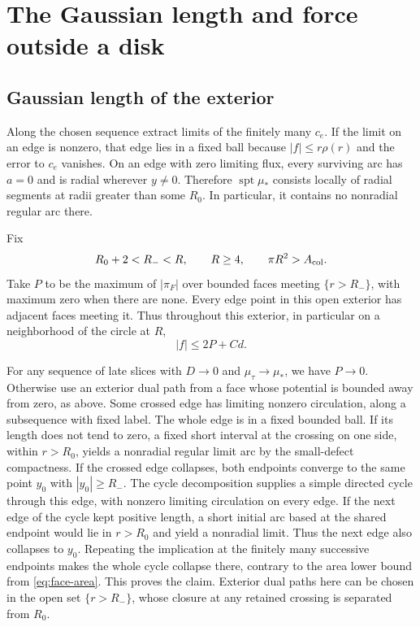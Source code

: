 \section{The Gaussian length and force outside a disk}\label{sec:exterior}

\subsection{Gaussian length of the exterior}

Along the chosen sequence extract limits of the finitely many \(c_e\). If the limit on an edge is nonzero, that edge lies in a fixed ball because \(|f|\le r\rho(r)\) and the error to \(c_e\) vanishes. On an edge with zero limiting flux, every surviving arc has \(a=0\) and is radial wherever \(y\ne0\). Therefore \(\operatorname{spt}\mu_*\) consists locally of radial segments at radii greater than some \(R_0\). In particular, it contains no nonradial regular arc there.

Fix \[
 R_0+2<R_-<R,\qquad R\ge4,\qquad \pi R^2>A_{\rm col}.
\] Take \(P\) to be the maximum of \(|\pi_F|\) over bounded faces meeting \(\{r>R_-\}\), with maximum zero when there are none. Every edge point in this open exterior has adjacent faces meeting it. Thus throughout this exterior, in particular on a neighborhood of the circle at \(R\), \begin{equation}\label{eq:flux}
 |f|\le 2P+Cd.
\end{equation}

For any sequence of late slices with \(D\to0\) and \(\mu_\tau\to\mu_*\), we have \(P\to0\). Otherwise use an exterior dual path from a face whose potential is bounded away from zero, as above. Some crossed edge has limiting nonzero circulation, along a subsequence with fixed label. The whole edge is in a fixed bounded ball. If its length does not tend to zero, a fixed short interval at the crossing on one side, within \(r>R_0\), yields a nonradial regular limit arc by the small-defect compactness. If the crossed edge collapses, both endpoints converge to the same point \(y_0\) with \(|y_0|\ge R_-\). The cycle decomposition supplies a simple directed cycle through this edge, with nonzero limiting circulation on every edge. If the next edge of the cycle kept positive length, a short initial arc based at the shared endpoint would lie in \(r>R_0\) and yield a nonradial limit. Thus the next edge also collapses to \(y_0\). Repeating the implication at the finitely many successive endpoints makes the whole cycle collapse there, contrary to the area lower bound from \eqref{eq:face-area}. This proves the claim. Exterior dual paths here can be chosen in the open set \(\{r>R_-\}\), whose closure at any retained crossing is separated from \(R_0\).

